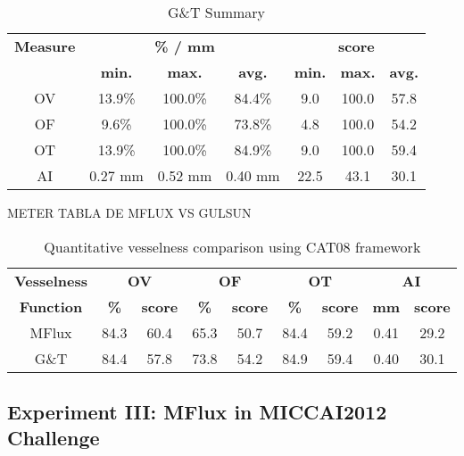 \begin{table*}
\scriptsize
\caption{G\&T Summary}
\centering
\begin{tabular}{|c|ccc|ccc|}
\hline
\multicolumn{1}{|c|}{\textbf{Measure}} &\multicolumn{3}{c|}{\textbf{\% / mm}} &\multicolumn{3}{c|}{\textbf{score}}  \\
\multicolumn{1}{|c|}{\textbf{}} &\multicolumn{1}{c|}{\textbf{min.}} &\multicolumn{1}{c|}{\textbf{max.}} &\multicolumn{1}{c|}{\textbf{avg.}} &\multicolumn{1}{c|}{\textbf{min.}} &\multicolumn{1}{c|}{\textbf{max.}} &\multicolumn{1}{c|}{\textbf{avg.}}\\
\hline
OV&13.9\%&100.0\%&84.4\%& 9.0&100.0&57.8\\
OF& 9.6\%&100.0\%&73.8\%& 4.8&100.0&54.2\\
OT&13.9\%&100.0\%&84.9\%& 9.0&100.0&59.4\\
AI&0.27 mm&0.52 mm&0.40 mm&22.5&43.1&30.1\\
\hline
\end{tabular}
\vspace{-0.3cm}
\label{tb:tb_4_6}
\normalsize
\end{table*}

METER TABLA DE MFLUX VS GULSUN

\begin{table*}
\scriptsize
\caption{Quantitative vesselness comparison using CAT08 framework}
\centering
\begin{tabular}{|c|cc|cc|cc|cc|}
\hline
\multicolumn{1}{|c|}{\textbf{Vesselness}} &\multicolumn{2}{c|}{\textbf{OV}} &\multicolumn{2}{c|}{\textbf{OF}} &\multicolumn{2}{c|}{\textbf{OT}}&\multicolumn{2}{c|}{\textbf{AI}}\\
\multicolumn{1}{|c|}{\textbf{Function}} &\multicolumn{1}{c|}{\textbf{\%}} &\multicolumn{1}{c|}{\textbf{score}} &\multicolumn{1}{c|}{\textbf{\%}} &\multicolumn{1}{c|}{\textbf{score}} &\multicolumn{1}{c|}{\textbf{\%}} &\multicolumn{1}{c|}{\textbf{score}}&\multicolumn{1}{c|}{\textbf{mm}} &\multicolumn{1}{c|}{\textbf{score}}\\
\hline
MFlux&84.3&60.4&65.3&50.7&84.4&59.2&0.41&29.2\\
G\&T&84.4&57.8&73.8&54.2&84.9&59.4&0.40&30.1\\
\hline
\end{tabular}
\vspace{-0.3cm}
\label{tb:tb_4_4}
\normalsize
\end{table*}


\subsection{Experiment III: MFlux in MICCAI2012 Challenge}


